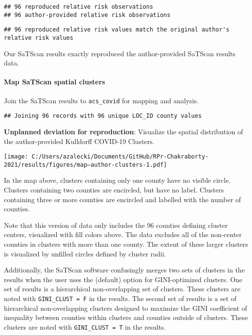 \documentclass[
]{article}
\begin{document}
\begin{verbatim}
## 96 reproduced relative risk observations
## 96 author-provided relative risk observations
\end{verbatim}

\begin{verbatim}
## 96 reproduced relative risk values match the original author's relative risk values
\end{verbatim}

Our SaTScan results exactly reproduced the author-provided SaTScan
results data.

\hypertarget{map-satscan-spatial-clusters}{%
\paragraph{Map SaTScan spatial
clusters}\label{map-satscan-spatial-clusters}}

Join the SaTScan results to \texttt{acs\_covid} for mapping and
analysis.

\begin{verbatim}
## Joining 96 records with 96 unique LOC_ID county values
\end{verbatim}

\textbf{Unplanned deviation for reproduction}: Visualize the spatial
distribution of the author-provided Kulldorff COVID-19 Clusters.

\texttt{[image: C:/Users/azalecki/Documents/GitHub/RPr-Chakraborty-2021/results/figures/map--author-clusters-1.pdf]}

In the map above, clusters containing only one county have no visible
circle. Clusters containing two counties are encircled, but have no
label. Clusters containing three or more counties are encircled and
labelled with the number of counties.

Note that this version of data only includes the 96 counties defining
cluster centers, visualized with fill colors above. The data excludes
all of the non-center counties in clusters with more than one county.
The extent of these larger clusters is visualized by unfilled circles
defined by cluster radii.

Additionally, the SaTScan software confusingly merges two sets of
clusters in the results when the user uses the (default) option for
GINI-optimized clusters. One set of results is a hierarchical
non-overlapping set of clusters. These clusters are noted with
\texttt{GINI\_CLUST\ =\ F} in the results. The second set of results is
a set of hierarchical non-overlapping clusters designed to maximize the
GINI coefficient of inequality between counties within clusters and
counties outside of clusters. These clusters are noted with
\texttt{GINI\_CLUST\ =\ T} in the results.
\end{document}
